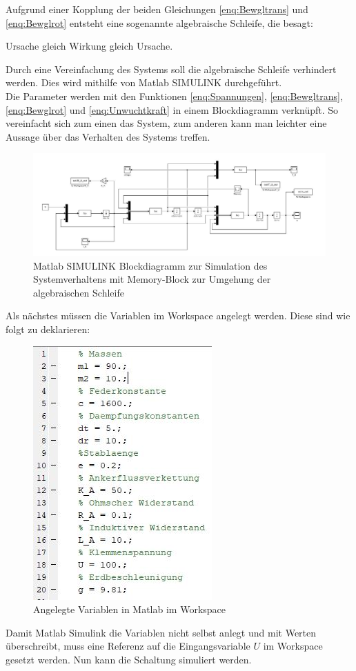 Aufgrund einer Kopplung der beiden Gleichungen \ref{enq:Bewgltrans} und \ref{enq:Bewglrot} entsteht eine sogenannte algebraische Schleife, die besagt:

\begin{center}
	Ursache gleich Wirkung gleich Ursache.
\end{center}

Durch eine Vereinfachung des Systems soll die algebraische Schleife verhindert werden. Dies wird mithilfe von Matlab SIMULINK durchgeführt. \\
Die Parameter werden mit den Funktionen \ref{enq:Spannungen}, \ref{enq:Bewgltrans}, \ref{enq:Bewglrot} und \ref{enq:Unwuchtkraft} in einem Blockdiagramm verknüpft. So vereinfacht sich zum einen das System, zum anderen kann man leichter eine Aussage über das Verhalten des Systems treffen.

\begin{figure}[hbt]
	\centering
	\includegraphics[width=1\linewidth]{Images/ProjektB_Elektrik_Blockdiagramm}
	\caption{Matlab SIMULINK Blockdiagramm zur Simulation des Systemverhaltens mit Memory-Block zur Umgehung der algebraischen Schleife}
	\label{fig:Blockdiagramm}
\end{figure}

Als nächstes müssen die Variablen im Workspace angelegt werden. Diese sind wie folgt zu deklarieren:

\begin{figure}[hbt]
	\centering
	\includegraphics[width=0.3\linewidth]{Images/Variablen}
	\caption{Angelegte Variablen in Matlab im Workspace}
	\label{fig:Variablen}
\end{figure}

Damit Matlab Simulink die Variablen nicht selbst anlegt und mit Werten überschreibt, muss eine Referenz auf die Eingangsvariable $U$ im Workspace gesetzt werden. Nun kann die Schaltung simuliert werden.